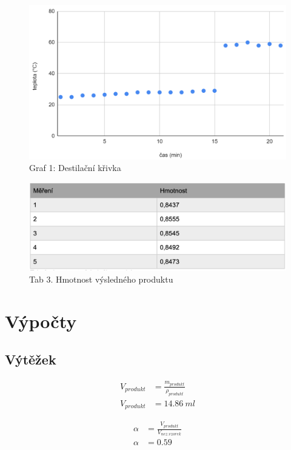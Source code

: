 \documentclass[13pt, a4paper, twoside]{article}
\begin{document}
\begin{figure}[H]
    \centering
    \includegraphics[width=6in]{uloha_9_graf_1.png}
    \caption*{Graf 1: Destilační křivka}
\end{figure}

\begin{figure}[H]
    \centering
    \includegraphics[width=6in]{uloha_9_tab_3.png}
    \caption*{Tab 3. Hmotnost výsledného produktu}
\end{figure}

\section*{Výpočty}
\subsection*{Výtěžek}
\begin{align*}
    V_{produkt} &= \frac{m_{produkt}}{\rho_{produkt}}\\
    V_{produkt} &= 14.86 \: ml
\end{align*}

\begin{align*}
    \alpha &= \frac{V_{produkt}}{V_{nez. vzorek}}\\
    \alpha &= 0.59
\end{align*}
\end{document}
